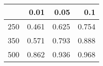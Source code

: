 % 
\begin{tabular}{rrrr}
  \hline
 & 0.01 & 0.05 & 0.1 \\ 
  \hline
250 & 0.461 & 0.625 & 0.754 \\ 
  350 & 0.571 & 0.793 & 0.888 \\ 
  500 & 0.862 & 0.936 & 0.968 \\ 
   \hline
\end{tabular}

